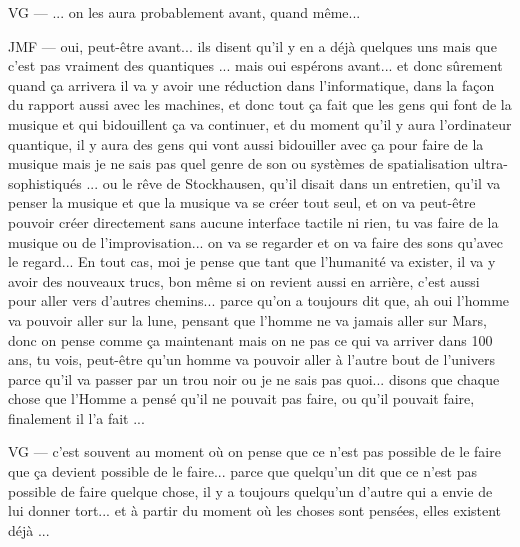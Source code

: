 VG — ... on les aura probablement avant, quand même... 

JMF — oui, peut-être avant... ils disent qu'il y en a déjà quelques uns mais que c'est pas vraiment des quantiques ... mais oui espérons avant... et donc sûrement quand ça arrivera il va y avoir une réduction dans l'informatique, dans la façon du rapport aussi avec les machines, et donc tout ça fait que les gens qui font de la musique et qui bidouillent ça va continuer, et du moment qu'il y aura l'ordinateur quantique, il y aura des gens qui vont aussi bidouiller avec ça pour faire de la musique mais je ne sais pas quel genre de son ou systèmes de spatialisation ultra-sophistiqués ... ou le rêve de Stockhausen, qu'il disait dans un entretien, qu'il va penser la musique et que la musique va se créer tout seul, et on va peut-être pouvoir créer directement sans aucune interface tactile ni rien, tu vas faire de la musique ou de l'improvisation... on va se regarder et on va faire des sons qu'avec le regard... En tout cas, moi je pense que tant que l'humanité va exister, il va y avoir des nouveaux trucs, bon même si on revient aussi en arrière, c'est aussi pour aller vers d'autres chemins... parce qu'on a toujours dit que, ah oui l'homme va pouvoir aller sur la lune, pensant que l'homme ne va jamais aller sur Mars, donc on pense comme ça maintenant mais on ne pas ce qui va arriver dans 100 ans, tu vois, peut-être qu'un homme va pouvoir aller à l'autre bout de l'univers parce qu'il va passer par un trou noir ou je ne sais pas quoi... disons que chaque chose que l'Homme a pensé qu'il ne pouvait pas faire, ou qu'il pouvait faire, finalement il l'a fait ... 

VG — c'est souvent au moment où on pense que ce n'est pas possible de le faire que ça devient possible de le faire... parce que quelqu'un dit que ce n'est pas possible de faire quelque chose, il y a toujours quelqu'un d'autre qui a envie de lui donner tort... et à partir du moment où les choses sont pensées, elles existent déjà ... 


